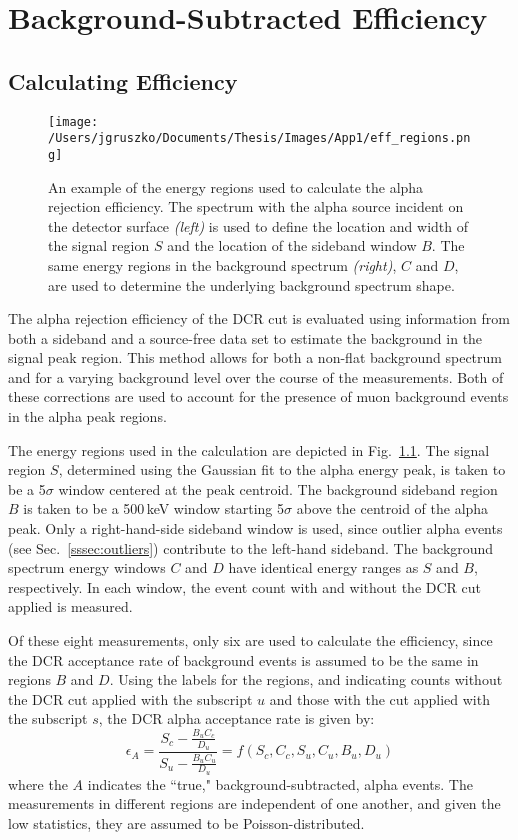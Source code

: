 \chapter{Background-Subtracted Efficiency}
\section{Calculating Efficiency}
\begin{figure}[]
  \centering
 \texttt{[image: /Users/jgruszko/Documents/Thesis/Images/App1/eff\_regions.png]}
\caption[The energy regions used to calculate the alpha rejection efficiency]{An example of the energy regions used to calculate the alpha rejection efficiency. The spectrum with the alpha source incident on the detector surface {\it (left)} is used to define the location and width of the signal region $S$ and the location of the sideband window $B$. The same energy regions in the background spectrum {\it (right)}, $C$ and $D$, are used to determine the underlying background spectrum shape.}
\label{fig:regions}
\end{figure}

The alpha rejection efficiency of the DCR cut is evaluated using information from both a sideband and a source-free data set to estimate the background in the signal peak region. This method allows for both a non-flat background spectrum and for a varying background level over the course of the measurements. Both of these corrections are used to account for the presence of muon background events in the alpha peak regions. 
 
The energy regions used in the calculation are depicted in Fig.~\ref{fig:regions}. The signal region $S$, determined using the Gaussian fit to the alpha energy peak, is taken to be a 5$\sigma$ window centered at the peak centroid. The background sideband region $B$ is taken to be a 500\,keV window starting 5$\sigma$ above the centroid of the alpha peak. Only a right-hand-side sideband window is used, since outlier alpha events (see Sec.~\ref{sssec:outliers}) contribute to the left-hand sideband. The background spectrum energy windows $C$ and $D$ have identical energy ranges as $S$ and $B$, respectively. In each window, the event count with and without the DCR cut applied is measured. 

Of these eight measurements, only six are used to calculate the efficiency, since the DCR acceptance rate of background events is assumed to be the same in regions $B$ and $D$. Using the labels for the regions, and indicating counts without the DCR cut applied with the subscript $u$ and those with the cut applied with the subscript $s$, the DCR alpha acceptance rate is given by:
\begin{equation}
\epsilon_A = \frac{S_c - \frac{B_u C_c}{D_u}}{S_u - \frac{B_u C_u}{D_u}} = f(S_c, C_c, S_u, C_u, B_u, D_u) 
\label{eqn:eff}
\end{equation}
where the $A$ indicates the ``true," background-subtracted, alpha events. The measurements in different regions are independent of one another, and given the low statistics, they are assumed to be Poisson-distributed.

